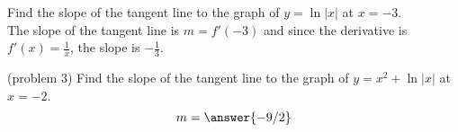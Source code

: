 \documentclass[handout]{ximera}
\begin{document}
\begin{example}[example 3]
Find the slope of the tangent line to the graph of $y = \ln|x|$ at $x = -3$.\\
The slope of the tangent line is $m = f'(-3)$ and since the derivative is $f'(x) = \frac{1}{x}$,
the slope is $-\frac13$.
\end{example}
 
\begin{problem}(problem 3)
Find the slope of the tangent line to the graph of $y= x^2 + \ln|x|$ at $x = -2$.
\[
m = \answer{-9/2}
\]
\end{problem}
 
  
\begin{foldable}
\end{foldable}
\end{document}
